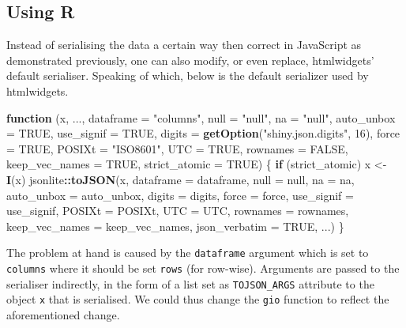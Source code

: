 \documentclass[
]{krantz}
\makeatletter
\newenvironment{Shaded}{\begin{snugshade}}{\end{snugshade}}
\newcommand{\ControlFlowTok}[1]{\textcolor[rgb]{0.27,0.27,0.27}{\textbf{#1}}}
\newcommand{\DataTypeTok}[1]{\textcolor[rgb]{0.27,0.27,0.27}{#1}}
\newcommand{\DecValTok}[1]{\textcolor[rgb]{0.06,0.06,0.06}{#1}}
\newcommand{\KeywordTok}[1]{\textcolor[rgb]{0.27,0.27,0.27}{\textbf{#1}}}
\newcommand{\NormalTok}[1]{#1}
\newcommand{\OperatorTok}[1]{\textcolor[rgb]{0.43,0.43,0.43}{\textbf{#1}}}
\newcommand{\OtherTok}[1]{\textcolor[rgb]{0.37,0.37,0.37}{#1}}
\newcommand{\StringTok}[1]{\textcolor[rgb]{0.5,0.5,0.5}{#1}}
\newenvironment{kframe}{%
\medskip{}
\setlength{\fboxsep}{.8em}
 \def\at@end@of@kframe{}%
 \ifinner\ifhmode%
  \def\at@end@of@kframe{\end{minipage}}%
  \begin{minipage}{\columnwidth}%
 \fi\fi%
 \def\FrameCommand##1{\hskip\@totalleftmargin \hskip-\fboxsep
 \colorbox{shadecolor}{##1}\hskip-\fboxsep
     \hskip-\linewidth \hskip-\@totalleftmargin \hskip\columnwidth}%
 \MakeFramed {\advance\hsize-\width
   \@totalleftmargin\z@ \linewidth\hsize
   \@setminipage}}%
 {\par\unskip\endMakeFramed%
 \at@end@of@kframe}
\renewenvironment{Shaded}{\begin{kframe}}{\end{kframe}}
\makeatother
\begin{document}
\hypertarget{widgets-full-transform-data-r}{%
\subsection{Using R}\label{widgets-full-transform-data-r}}

Instead of serialising the data a certain way then correct in JavaScript as demonstrated previously, one can also modify, or even replace, htmlwidgets' default serialiser. Speaking of which, below is the default serializer used by htmlwidgets.

\begin{Shaded}
\begin{Highlighting}[]
\ControlFlowTok{function}\NormalTok{ (x, ..., }\DataTypeTok{dataframe =} \StringTok{"columns"}\NormalTok{, }\DataTypeTok{null =} \StringTok{"null"}\NormalTok{, }
\DataTypeTok{na =} \StringTok{"null"}\NormalTok{, }\DataTypeTok{auto\_unbox =} \OtherTok{TRUE}\NormalTok{, }\DataTypeTok{use\_signif =} \OtherTok{TRUE}\NormalTok{, }
  \DataTypeTok{digits =} \KeywordTok{getOption}\NormalTok{(}\StringTok{"shiny.json.digits"}\NormalTok{, }\DecValTok{16}\NormalTok{), }\DataTypeTok{force =} \OtherTok{TRUE}\NormalTok{,}
  \DataTypeTok{POSIXt =} \StringTok{"ISO8601"}\NormalTok{, }\DataTypeTok{UTC =} \OtherTok{TRUE}\NormalTok{, }\DataTypeTok{rownames =} \OtherTok{FALSE}\NormalTok{, }
  \DataTypeTok{keep\_vec\_names =} \OtherTok{TRUE}\NormalTok{, }\DataTypeTok{strict\_atomic =} \OtherTok{TRUE}\NormalTok{) }
\NormalTok{\{}
  \ControlFlowTok{if}\NormalTok{ (strict\_atomic) }
\NormalTok{      x \textless{}{-}}\StringTok{ }\KeywordTok{I}\NormalTok{(x)}
\NormalTok{  jsonlite}\OperatorTok{::}\KeywordTok{toJSON}\NormalTok{(x, }\DataTypeTok{dataframe =}\NormalTok{ dataframe, }\DataTypeTok{null =}\NormalTok{ null, }\DataTypeTok{na =}\NormalTok{ na, }
    \DataTypeTok{auto\_unbox =}\NormalTok{ auto\_unbox, }\DataTypeTok{digits =}\NormalTok{ digits, }\DataTypeTok{force =}\NormalTok{ force, }
    \DataTypeTok{use\_signif =}\NormalTok{ use\_signif, }\DataTypeTok{POSIXt =}\NormalTok{ POSIXt, }\DataTypeTok{UTC =}\NormalTok{ UTC, }
    \DataTypeTok{rownames =}\NormalTok{ rownames, }\DataTypeTok{keep\_vec\_names =}\NormalTok{ keep\_vec\_names, }
    \DataTypeTok{json\_verbatim =} \OtherTok{TRUE}\NormalTok{, ...)}
\NormalTok{\}}
\end{Highlighting}
\end{Shaded}

The problem at hand is caused by the \texttt{dataframe} argument which is set to \texttt{columns} where it should be set \texttt{rows} (for row-wise). Arguments are passed to the serialiser indirectly, in the form of a list set as \texttt{TOJSON\_ARGS} attribute to the object \texttt{x} that is serialised. We could thus change the \texttt{gio} function to reflect the aforementioned change.
\end{document}
